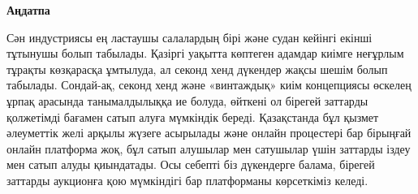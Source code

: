 \newpage
\pagestyle{plain}

{
\begin{center}
    \Large
    \textbf{Аңдатпа}
\end{center}
Сән индустриясы ең ластаушы салалардың бірі және судан кейінгі екінші тұтынушы болып табылады. Қазіргі уақытта көптеген адамдар киімге неғұрлым тұрақты көзқарасқа ұмтылуда, ал секонд хенд дүкендер жақсы шешім болып табылады. Сондай-ақ, секонд хенд және «винтаждық» киім концепциясы өскелең ұрпақ арасында танымалдылыққа ие болуда, өйткені ол бірегей заттарды қолжетімді бағамен сатып алуға мүмкіндік береді. Қазақстанда бұл қызмет әлеуметтік желі арқылы жүзеге асырылады және онлайн процестері бар бірыңғай онлайн платформа жоқ, бұл сатып алушылар мен сатушылар үшін заттарды іздеу мен сатып алуды қиындатады. Осы себепті біз дүкендерге балама, бірегей заттарды аукционға қою мүмкіндігі бар платформаны көрсеткіміз келеді.
}
